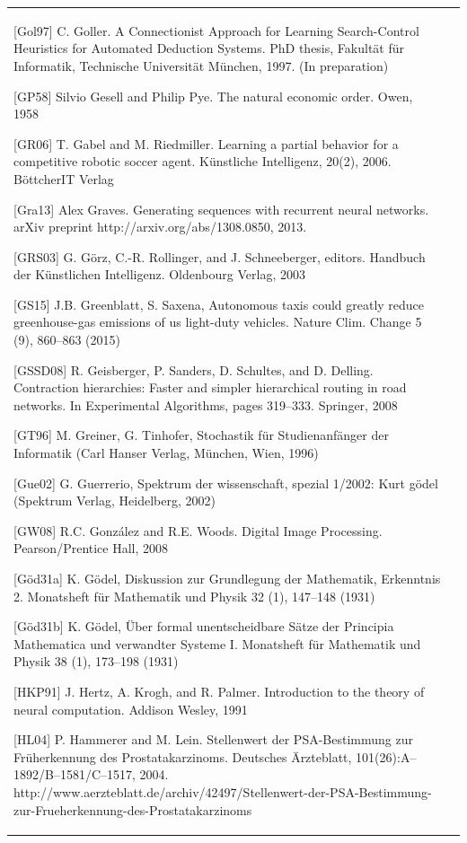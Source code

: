 \documentclass[10pt]{book}
\begin{document}
\begin{tabular}{|l|l|}
[Gol97] C. Goller. A Connectionist Approach for Learning Search-Control Heuristics for Automated Deduction Systems. PhD thesis, Fakult\"at f\"ur Informatik, Technische Universit\"at M\"unchen, 1997. (In preparation)

[GP58] Silvio Gesell and Philip Pye. The natural economic order. Owen, 1958

[GR06] T. Gabel and M. Riedmiller. Learning a partial behavior for a competitive robotic soccer agent. K\"unstliche Intelligenz, 20(2), 2006. B\"ottcherIT Verlag

[Gra13] Alex Graves. Generating sequences with recurrent neural networks. arXiv preprint http://arxiv.org/abs/1308.0850, 2013.

[GRS03] G. G\"orz, C.-R. Rollinger, and J. Schneeberger, editors. Handbuch der K\"unstlichen Intelligenz. Oldenbourg Verlag, 2003

[GS15] J.B. Greenblatt, S. Saxena, Autonomous taxis could greatly reduce greenhouse-gas emissions of us light-duty vehicles. Nature Clim. Change 5 (9), 860--863 (2015)

[GSSD08] R. Geisberger, P. Sanders, D. Schultes, and D. Delling. Contraction hierarchies: Faster and simpler hierarchical routing in road networks. In Experimental Algorithms, pages 319--333. Springer, 2008

[GT96] M. Greiner, G. Tinhofer, Stochastik f\"ur Studienanf\"anger der Informatik (Carl Hanser Verlag, M\"unchen, Wien, 1996)

[Gue02] G. Guerrerio, Spektrum der wissenschaft, spezial 1/2002: Kurt g\"odel (Spektrum Verlag, Heidelberg, 2002)

[GW08] R.C. Gonz\'alez and R.E. Woods. Digital Image Processing. Pearson/Prentice Hall, 2008

[G\"od31a] K. G\"odel, Diskussion zur Grundlegung der Mathematik, Erkenntnis 2. Monatsheft f\"ur Mathematik und Physik 32 (1), 147--148 (1931)

[G\"od31b] K. G\"odel, \"Uber formal unentscheidbare S\"atze der Principia Mathematica und verwandter Systeme I. Monatsheft f\"ur Mathematik und Physik 38 (1), 173--198 (1931)

[HKP91] J. Hertz, A. Krogh, and R. Palmer. Introduction to the theory of neural computation. Addison Wesley, 1991

[HL04] P. Hammerer and M. Lein. Stellenwert der PSA-Bestimmung zur Fr\"uherkennung des Prostatakarzinoms. Deutsches \"Arzteblatt, 101(26):A--1892/B--1581/C--1517, 2004. http://www.aerzteblatt.de/archiv/42497/Stellenwert-der-PSA-Bestimmung-zur-Frueherkennung-des-Prostatakarzinoms


\end{tabular}
\end{document}
